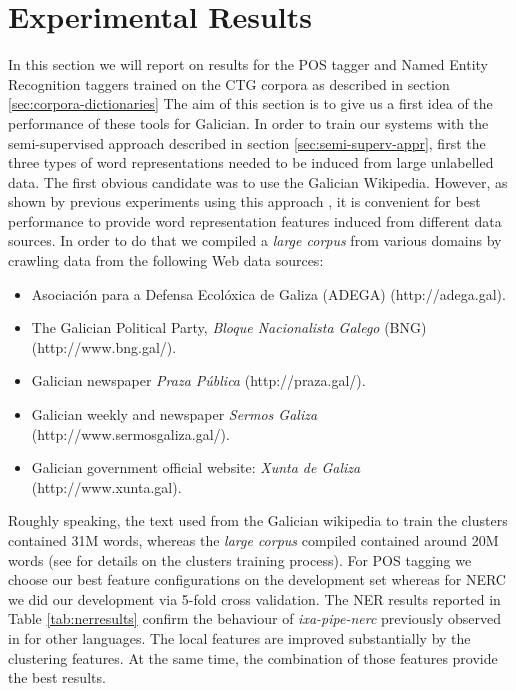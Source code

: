 \documentclass[10pt, a4paper]{article}
\begin{document}
\section{Experimental Results}\label{sec:experimental-results}

In this section we will report on results for the POS tagger and Named Entity Recognition taggers trained on the CTG corpora as described in section \ref{sec:corpora-dictionaries} The aim of this section is to give us a first idea of the performance of these tools for Galician. In order to train our systems with the semi-supervised approach described in section \ref{sec:semi-superv-appr}, first the three types of word representations needed to be induced from large unlabelled data. The first obvious candidate was to use the Galician Wikipedia. However, as shown by previous experiments using this approach \cite{agerri2016robust}, it is convenient for best performance to provide word representation features induced from different data sources. In order to do that we compiled a \emph{large corpus} from various domains by crawling data from the following Web data sources:

\begin{itemize}
\item Asociaci\'on para a Defensa Ecol\'oxica de Galiza (ADEGA) (http://adega.gal).
\item The Galician Political Party, \emph{Bloque Nacionalista Galego} (BNG) (http://www.bng.gal/).
\item Galician newspaper \emph{Praza P\'ublica} (http://praza.gal/).
\item Galician weekly and newspaper \emph{Sermos Galiza} (http://www.sermosgaliza.gal/).
\item Galician government official website: \emph{Xunta de Galiza} (http://www.xunta.gal).
\end{itemize}

Roughly speaking, the text used from the Galician wikipedia to train the clusters contained 31M words, whereas the \emph{large corpus} compiled contained around 20M words (see \cite{agerri2016robust} for details on the clusters training process). For POS tagging we choose our best feature configurations on the development set whereas for NERC we did our development via 5-fold cross validation. The NER results reported in Table \ref{tab:nerresults} confirm the behaviour of \emph{ixa-pipe-nerc} previously observed in \cite{agerri2016robust} for other languages. The local features are improved substantially by the clustering features. At the same time, the combination of those features provide the best results.
\end{document}
